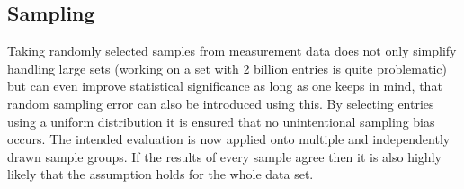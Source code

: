 \subsection{Sampling}
Taking randomly selected samples from measurement data does not only simplify handling large sets (working on a set with 2 billion entries is quite problematic) but can even improve statistical significance as long as one keeps in mind, that random sampling error can also be introduced using this.
By selecting entries using a uniform distribution it is ensured that no unintentional sampling bias occurs. The intended evaluation is now applied onto multiple and independently drawn sample groups. If the results of every sample agree then it is also highly likely that the assumption holds for the whole data set.

